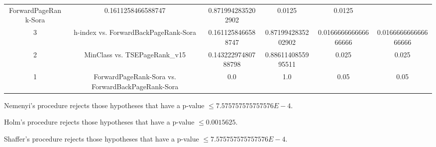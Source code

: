 \documentclass[a4paper,10pt]{article}
\begin{document}
\begin{landscape}
\begin{table}[!htp]
\begin{tabular}{cccccc}
ForwardPageRank-Sora&0.1611258466588747&0.8719942835202902&0.0125&0.0125\\3&h-index vs. ForwardBackPageRank-Sora&0.1611258466588747&0.8719942835202902&0.016666666666666666&0.016666666666666666\\2&MinClass vs. TSEPageRank_v15&0.14322297480788798&0.8861140855995511&0.025&0.025\\1&ForwardPageRank-Sora vs. ForwardBackPageRank-Sora&0.0&1.0&0.05&0.05\\\hline
\end{tabular}
\end{table}
Nemenyi's procedure rejects those hypotheses that have a p-value $\le7.575757575757576E-4$.


Holm's procedure rejects those hypotheses that have a p-value $\le0.0015625$.


Shaffer's procedure rejects those hypotheses that have a p-value $\le7.575757575757576E-4$.



\end{landscape}
\end{document}
